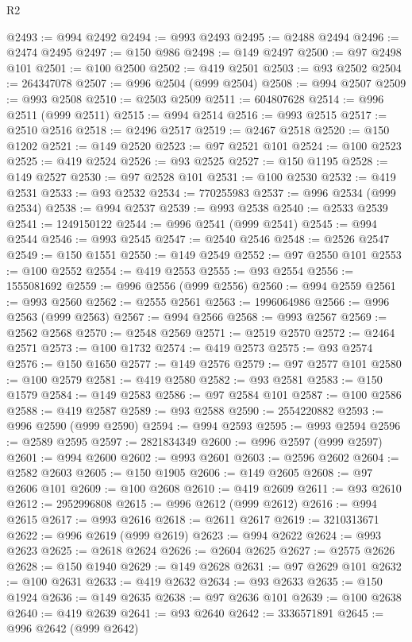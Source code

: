 \begin{lexlean}{R2}
\begin{coremodule}
@2493 := @994 @2492
@2494 := @993 @2493
@2495 := @2488 @2494
@2496 := @2474 @2495
@2497 := @150 @986
@2498 := @149 @2497
@2500 := @97 @2498 @101
@2501 := @100 @2500
@2502 := @419 @2501
@2503 := @93 @2502
@2504 := 264347078
@2507 := @996 @2504 (@999 @2504)
@2508 := @994 @2507
@2509 := @993 @2508
@2510 := @2503 @2509
@2511 := 604807628
@2514 := @996 @2511 (@999 @2511)
@2515 := @994 @2514
@2516 := @993 @2515
@2517 := @2510 @2516
@2518 := @2496 @2517
@2519 := @2467 @2518
@2520 := @150 @1202
@2521 := @149 @2520
@2523 := @97 @2521 @101
@2524 := @100 @2523
@2525 := @419 @2524
@2526 := @93 @2525
@2527 := @150 @1195
@2528 := @149 @2527
@2530 := @97 @2528 @101
@2531 := @100 @2530
@2532 := @419 @2531
@2533 := @93 @2532
@2534 := 770255983
@2537 := @996 @2534 (@999 @2534)
@2538 := @994 @2537
@2539 := @993 @2538
@2540 := @2533 @2539
@2541 := 1249150122
@2544 := @996 @2541 (@999 @2541)
@2545 := @994 @2544
@2546 := @993 @2545
@2547 := @2540 @2546
@2548 := @2526 @2547
@2549 := @150 @1551
@2550 := @149 @2549
@2552 := @97 @2550 @101
@2553 := @100 @2552
@2554 := @419 @2553
@2555 := @93 @2554
@2556 := 1555081692
@2559 := @996 @2556 (@999 @2556)
@2560 := @994 @2559
@2561 := @993 @2560
@2562 := @2555 @2561
@2563 := 1996064986
@2566 := @996 @2563 (@999 @2563)
@2567 := @994 @2566
@2568 := @993 @2567
@2569 := @2562 @2568
@2570 := @2548 @2569
@2571 := @2519 @2570
@2572 := @2464 @2571
@2573 := @100 @1732
@2574 := @419 @2573
@2575 := @93 @2574
@2576 := @150 @1650
@2577 := @149 @2576
@2579 := @97 @2577 @101
@2580 := @100 @2579
@2581 := @419 @2580
@2582 := @93 @2581
@2583 := @150 @1579
@2584 := @149 @2583
@2586 := @97 @2584 @101
@2587 := @100 @2586
@2588 := @419 @2587
@2589 := @93 @2588
@2590 := 2554220882
@2593 := @996 @2590 (@999 @2590)
@2594 := @994 @2593
@2595 := @993 @2594
@2596 := @2589 @2595
@2597 := 2821834349
@2600 := @996 @2597 (@999 @2597)
@2601 := @994 @2600
@2602 := @993 @2601
@2603 := @2596 @2602
@2604 := @2582 @2603
@2605 := @150 @1905
@2606 := @149 @2605
@2608 := @97 @2606 @101
@2609 := @100 @2608
@2610 := @419 @2609
@2611 := @93 @2610
@2612 := 2952996808
@2615 := @996 @2612 (@999 @2612)
@2616 := @994 @2615
@2617 := @993 @2616
@2618 := @2611 @2617
@2619 := 3210313671
@2622 := @996 @2619 (@999 @2619)
@2623 := @994 @2622
@2624 := @993 @2623
@2625 := @2618 @2624
@2626 := @2604 @2625
@2627 := @2575 @2626
@2628 := @150 @1940
@2629 := @149 @2628
@2631 := @97 @2629 @101
@2632 := @100 @2631
@2633 := @419 @2632
@2634 := @93 @2633
@2635 := @150 @1924
@2636 := @149 @2635
@2638 := @97 @2636 @101
@2639 := @100 @2638
@2640 := @419 @2639
@2641 := @93 @2640
@2642 := 3336571891
@2645 := @996 @2642 (@999 @2642)

\end{coremodule}
\end{lexlean}
